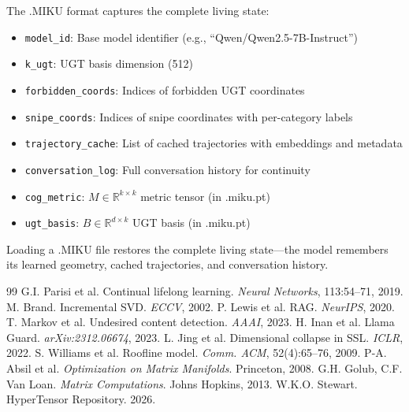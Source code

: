 \documentclass[11pt,a4paper]{article}
\begin{document}
The .MIKU format captures the complete living state:
\begin{itemize}[nosep]
\item \texttt{model\_id}: Base model identifier (e.g., ``Qwen/Qwen2.5-7B-Instruct'')
\item \texttt{k\_ugt}: UGT basis dimension (512)
\item \texttt{forbidden\_coords}: Indices of forbidden UGT coordinates
\item \texttt{snipe\_coords}: Indices of snipe coordinates with per-category labels
\item \texttt{trajectory\_cache}: List of cached trajectories with embeddings and metadata
\item \texttt{conversation\_log}: Full conversation history for continuity
\item \texttt{cog\_metric}: $M \in \mathbb{R}^{k \times k}$ metric tensor (in .miku.pt)
\item \texttt{ugt\_basis}: $B \in \mathbb{R}^{d \times k}$ UGT basis (in .miku.pt)
\end{itemize}

Loading a .MIKU file restores the complete living state---the model remembers its learned geometry, cached trajectories, and conversation history.

\begin{thebibliography}{99}
 G.I. Parisi et al. Continual lifelong learning. \textit{Neural Networks}, 113:54--71, 2019.
 M. Brand. Incremental SVD. \textit{ECCV}, 2002.
 P. Lewis et al. RAG. \textit{NeurIPS}, 2020.
 T. Markov et al. Undesired content detection. \textit{AAAI}, 2023.
 H. Inan et al. Llama Guard. \textit{arXiv:2312.06674}, 2023.
 L. Jing et al. Dimensional collapse in SSL. \textit{ICLR}, 2022.
 S. Williams et al. Roofline model. \textit{Comm. ACM}, 52(4):65--76, 2009.
 P-A. Absil et al. \textit{Optimization on Matrix Manifolds}. Princeton, 2008.
 G.H. Golub, C.F. Van Loan. \textit{Matrix Computations}. Johns Hopkins, 2013.
 W.K.O. Stewart. HyperTensor Repository. 2026.
\end{thebibliography}
\end{document}
